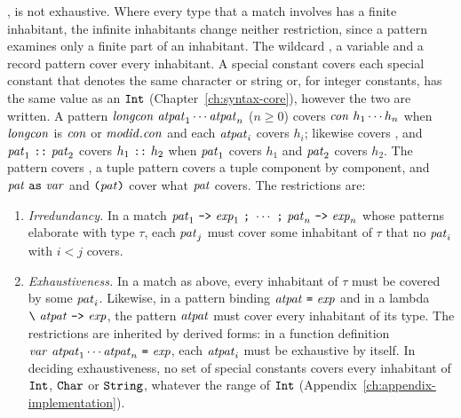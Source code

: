 ,  is not exhaustive. Where every
type that a match involves has a finite inhabitant, the infinite inhabitants
change neither restriction, since a pattern examines only a finite part of an
inhabitant. %
The wildcard \kw{\_}, a variable and a record pattern cover every inhabitant.
A special constant covers each special constant that denotes the same
character or string or, for integer constants, has the same value as an
$\mathtt{Int}$ (Chapter~\ref{ch:syntax-core}), however the two are written. %
A pattern $\mathit{longcon}\ \mathit{atpat}_1 \cdots \mathit{atpat}_n$ ($n \geq 0$) covers $\mathit{con}\ h_1
\cdots h_n$ when $\mathit{longcon}$ is $\mathit{con}$ or $\mathit{modid}.\mathit{con}$ and each $\mathit{atpat}_i$
covers $h_i$; likewise \kw{[\ ]} covers \kw{[]}, and $\pat_1\ \kw{::}\ \pat_2$
covers $h_1\ \kw{::}\ h_2$ when $\mathit{pat}_1$ covers $h_1$ and $\mathit{pat}_2$ covers
$h_2$. The pattern \kw{()} covers \kw{()}, a tuple pattern covers a tuple
component by component, and $\mathit{pat}\ \textnormal{\texttt{as}}\ \mathit{var}$ and $\textnormal{\texttt{(}}\mathit{pat}\textnormal{\texttt{)}}$ cover
what $\mathit{pat}$ covers. The restrictions are:

\begin{enumerate}
\item{} \emph{Irredundancy.} In a match $\mathit{pat}_1\ \textnormal{\texttt{->}}\ \mathit{exp}_1\ \textnormal{\texttt{;}}\ \cdots\
  \textnormal{\texttt{;}}\ \mathit{pat}_n\ \textnormal{\texttt{->}}\ \mathit{exp}_n$ whose patterns elaborate with type $\tau$,
  each $\mathit{pat}_j$ must cover some inhabitant of $\tau$ that no $\mathit{pat}_i$ with $i <
  j$ covers. %

\item{} \emph{Exhaustiveness.} In a match as above, every inhabitant of $\tau$
  must be covered by some $\mathit{pat}_i$. Likewise, in a pattern binding
  $\atpat\ \kw{=}\ \expm$ and in a lambda
  $\kw{\textbackslash}\ \atpat\ \kw{->}\ \expm$, the pattern $\mathit{atpat}$ must
  cover every inhabitant of its type. The
  restrictions are inherited by derived forms: in a function definition
  $\var\ \atpat_1 \cdots \atpat_n\ \kw{=}\ \expm$, each $\mathit{atpat}_i$ must be
  exhaustive by itself. In deciding exhaustiveness, no set of special
  constants covers every inhabitant of $\mathtt{Int}$, $\mathtt{Char}$ or $\mathtt{String}$, whatever the range of $\mathtt{Int}$
  (Appendix~\ref{ch:appendix-implementation}).
\end{enumerate}

